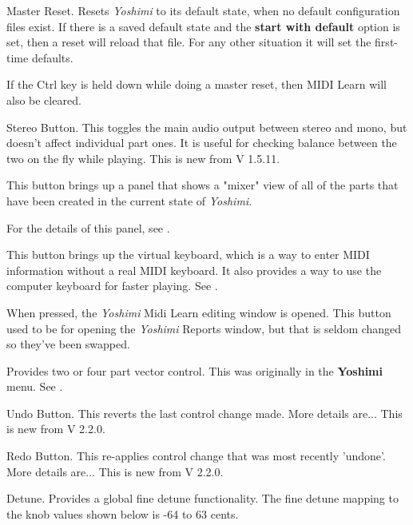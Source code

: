    Master Reset.
   Resets \textsl{Yoshimi} to its default state, when no default configuration
   files exist.  If there is a saved default state and the \textbf{start with
   default} option is set, then a reset will reload that file. For any other
   situation it will set the first-time defaults.

   If the Ctrl key is held down while doing a master reset, then
   MIDI Learn will also be cleared.

   Stereo Button.
   This toggles the main audio output between stereo and mono, but doesn't
   affect individual part ones.
   It is useful for checking balance between the two on the fly while playing.
   This is new from V 1.5.11.

   This button brings up a panel that shows a "mixer" view
   of all of the parts that have been created in the current
   state of \textsl{Yoshimi}.

   For the details of this panel,
   see .

   This button brings up the virtual keyboard, which is a way to enter
   MIDI information without a real MIDI keyboard.
   It also provides a way to use the computer keyboard for faster
   playing.  See .

   When pressed, the \textsl{Yoshimi} Midi Learn editing window is opened.
   This button used to be for opening the \textsl{Yoshimi} Reports window,
   but that is seldom changed so they've been swapped.

   Provides two or four part vector control.  This was originally in the \textbf{Yoshimi} menu.  See
   .

   Undo Button.
   This reverts the last control change made. More details are...
   This is new from V 2.2.0.

   Redo Button.
   This re-applies control change that was most recently 'undone'.
   More details are...
   This is new from V 2.2.0.

   Detune.  Provides a global fine detune functionality.
   The fine detune mapping to the knob values shown below is
   -64 to 63 cents.

